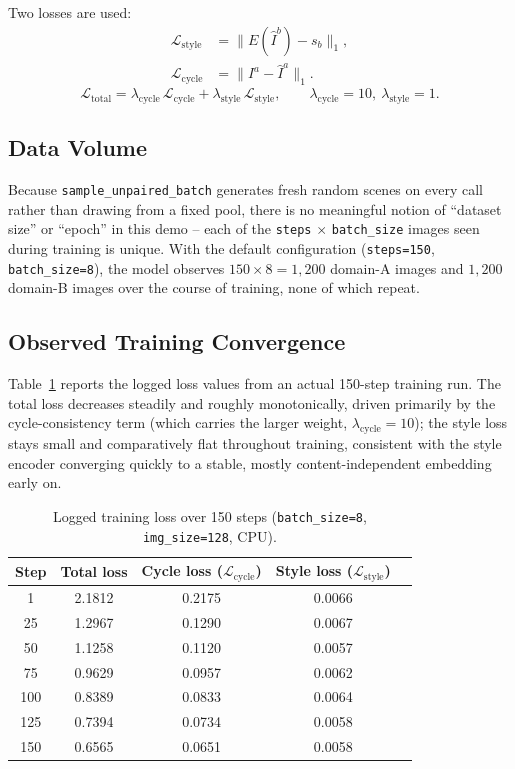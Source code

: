 \documentclass[11pt]{article}
\begin{document}
Two losses are used:
\begin{align}
    \mathcal{L}_{\text{style}} &= \| E(\hat{I}^b) - s_b \|_1, \\
    \mathcal{L}_{\text{cycle}} &= \| I^a - \hat{I}^a \|_1.
\end{align}
\begin{equation}
    \mathcal{L}_{\text{total}} = \lambda_{\text{cycle}} \, \mathcal{L}_{\text{cycle}}
        + \lambda_{\text{style}} \, \mathcal{L}_{\text{style}},
    \qquad \lambda_{\text{cycle}} = 10,\ \lambda_{\text{style}} = 1.
\end{equation}

\subsection{Data Volume}
Because \texttt{sample\_unpaired\_batch} generates fresh random scenes on
every call rather than drawing from a fixed pool, there is no meaningful
notion of ``dataset size'' or ``epoch'' in this demo -- each of the
\texttt{steps} $\times$ \texttt{batch\_size} images seen during training
is unique. With the default configuration
(\texttt{steps=150}, \texttt{batch\_size=8}), the model observes
$150 \times 8 = 1{,}200$ domain-A images and $1{,}200$ domain-B images
over the course of training, none of which repeat.

\subsection{Observed Training Convergence}
\label{sec:training-run}
Table~\ref{tab:losscurve} reports the logged loss values from an actual
150-step training run. The total loss decreases steadily and roughly
monotonically, driven primarily by the cycle-consistency term (which
carries the larger weight, $\lambda_{\text{cycle}}=10$); the style
loss stays small and comparatively flat throughout training, consistent
with the style encoder converging quickly to a stable, mostly
content-independent embedding early on.

\begin{table}[h]
\centering
\caption{Logged training loss over 150 steps
         (\texttt{batch\_size=8}, \texttt{img\_size=128}, CPU).}
\label{tab:losscurve}
\begin{tabular}{ccccc}
\hline
Step & Total loss & Cycle loss ($\mathcal{L}_{\text{cycle}}$) & Style loss ($\mathcal{L}_{\text{style}}$) \\
\hline
1   & 2.1812 & 0.2175 & 0.0066 \\
25  & 1.2967 & 0.1290 & 0.0067 \\
50  & 1.1258 & 0.1120 & 0.0057 \\
75  & 0.9629 & 0.0957 & 0.0062 \\
100 & 0.8389 & 0.0833 & 0.0064 \\
125 & 0.7394 & 0.0734 & 0.0058 \\
150 & 0.6565 & 0.0651 & 0.0058 \\
\hline
\end{tabular}
\end{table}
\end{document}
